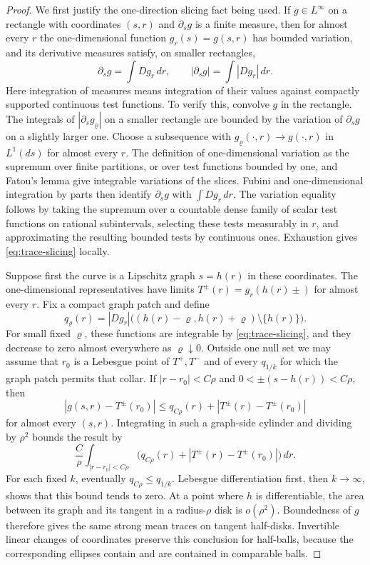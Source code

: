 \begin{proof}
We first justify the one-direction slicing fact being used.  If
$g\in L^\infty$ on a rectangle with coordinates $(s,r)$ and
$\partial_sg$ is a finite measure, then for almost every $r$ the
one-dimensional function $g_r(s)=g(s,r)$ has bounded variation, and
its derivative measures satisfy, on smaller rectangles,
\begin{equation}\label{eq:trace-slicing}
 \partial_sg=\int Dg_r\,dr,
 \qquad |\partial_sg|=\int |Dg_r|\,dr.
\end{equation}
Here integration of measures means integration of their values
against compactly supported continuous test functions.  To verify
this, convolve $g$ in the rectangle.  The integrals of
$|\partial_sg_\varrho|$ on a smaller rectangle are bounded by the
variation of $\partial_sg$ on a slightly larger one.  Choose a
subsequence with $g_\varrho(\cdot,r)\to g(\cdot,r)$ in $L^1(ds)$ for
almost every $r$.  The definition of one-dimensional variation as
the supremum over finite partitions, or over test functions bounded
by one, and Fatou's lemma give integrable variations of the slices.
Fubini and one-dimensional integration by parts then identify
$\partial_sg$ with $\int Dg_r\,dr$.  The variation equality follows
by taking the supremum over a countable dense family of scalar test
functions on rational subintervals, selecting these tests measurably
in $r$, and approximating the resulting bounded tests by continuous
ones.  Exhaustion gives \eqref{eq:trace-slicing} locally.

Suppose first the curve is a Lipschitz graph $s=h(r)$ in these
coordinates.  The one-dimensional representatives have limits
$T^\pm(r)=g_r(h(r)\pm)$ for almost every $r$.  Fix a compact graph
patch and define
\[
 q_\varrho(r)=|Dg_r|\bigl((h(r)-\varrho,h(r)+\varrho)
                                      \setminus\{h(r)\}\bigr).
\]
For small fixed $\varrho$, these functions are integrable by
\eqref{eq:trace-slicing}, and they decrease to zero almost everywhere
as $\varrho\downarrow0$.  Outside one null set we may assume that
$r_0$ is a Lebesgue point of $T^+,T^-$ and of every $q_{1/k}$ for
which the graph patch permits that collar.  If
$|r-r_0|<C\rho$ and $0<\pm(s-h(r))<C\rho$, then
\[
 |g(s,r)-T^\pm(r_0)|
 \le q_{C\rho}(r)+|T^\pm(r)-T^\pm(r_0)|
\]
for almost every $(s,r)$.  Integrating in such a graph-side cylinder
and dividing by $\rho^2$ bounds the result by
\[
 \frac{C}{\rho}\int_{|r-r_0|<C\rho}
       \bigl(q_{C\rho}(r)+|T^\pm(r)-T^\pm(r_0)|\bigr)\,dr.
\]
For each fixed $k$, eventually $q_{C\rho}\le q_{1/k}$.
Lebesgue differentiation first, then $k\to\infty$, shows that this
bound tends to zero.  At a point where $h$ is differentiable, the
area between its graph and its tangent in a radius-$\rho$ disk is
$o(\rho^2)$.  Boundedness of $g$ therefore gives the same strong mean
traces on tangent half-disks.  Invertible linear changes of coordinates
preserve this conclusion for half-balls, because the corresponding
ellipses contain and are contained in comparable balls.


\end{proof}
